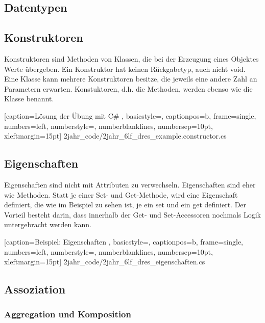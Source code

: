 \subsection{Datentypen}

\subsection{Konstruktoren}

Konstruktoren sind Methoden von Klassen, die bei der Erzeugung eines Objektes Werte übergeben. Ein Konstruktor hat keinen Rückgabetyp, auch nicht void. Eine Klasse kann mehrere Konstruktoren besitze, die jeweils eine andere Zahl an Parametern erwarten. Konstuktoren, d.h. die Methoden, werden ebenso wie die Klasse benannt.


	[caption={Lösung der Übung mit C\#}
	\label{lst:6lf_dres_example.constructor.cs},
	basicstyle=\small,
	captionpos=b,
	frame=single,
	numbers=left,
	numberstyle=\small,
	numberblanklines,
	numbersep=10pt,
	xleftmargin=15pt]
	{2jahr_code/2jahr_6lf_dres_example.constructor.cs}
	
\subsection{Eigenschaften}

Eigenschaften sind nicht mit Attributen zu verwechseln. Eigenschaften sind eher wie Methoden. Statt je einer Set- und Get-Methode, wird eine Eigenschaft definiert, die wie im Beispiel zu sehen ist, je ein set und ein get definiert. Der Vorteil besteht darin, dass innerhalb der Get- und Set-Accessoren nochmals Logik untergebracht werden kann.


	[caption={Beispiel: Eigenschaften}
	\label{lst:2jahr_6lf_dres_eigenschaften},
	basicstyle=\small,
	captionpos=b,
	frame=single,
	numbers=left,
	numberstyle=\small,
	numberblanklines,
	numbersep=10pt,
	xleftmargin=15pt]
	{2jahr_code/2jahr_6lf_dres_eigenschaften.cs}

\subsection{Assoziation}

\subsubsection{Aggregation und Komposition}

